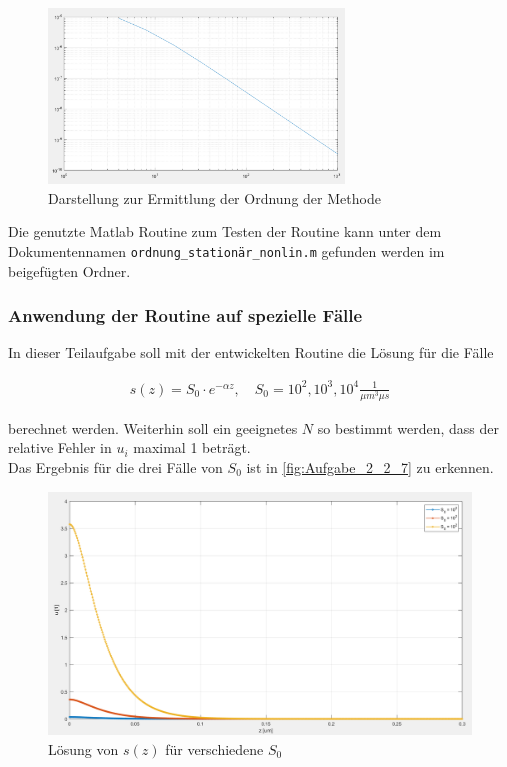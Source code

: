 \documentclass[
	pagesize,
	fontsize=12pt,
	paper=a4,
	oneside,
   reqno
]{scrartcl}
\begin{document}
\begin{figure}[H]
   \centering
   \includegraphics[width=0.7\textwidth]{Bilder/Aufgabe_2_2_6_b.png}
   \caption[Ordnung der Methode nichtlinear stationär]{Darstellung zur Ermittlung der Ordnung der Methode}
   \label{fig:Aufgabe_2_2_6_b}
\end{figure}

Die genutzte Matlab Routine zum Testen der Routine kann unter dem Dokumentennamen \texttt{ordnung\_stationär\_nonlin.m} gefunden werden im beigefügten Ordner.

\subsubsection{Anwendung der Routine auf spezielle Fälle}

In dieser Teilaufgabe soll mit der entwickelten Routine die Lösung für die Fälle

\begin{align*}
   s(z) = S_0 \cdot e^{-\alpha z}, \quad S_0 = 10^2, 10^3, 10^4 \frac{1}{\mu m^3 \mu s}
\end{align*}

berechnet werden. Weiterhin soll ein geeignetes $N$ so bestimmt werden, dass der relative Fehler in $u_i$ maximal 1\textperthousand{} beträgt. \\

Das Ergebnis für die drei Fälle von $S_0$ ist in \autoref{fig:Aufgabe_2_2_7} zu erkennen.

\begin{figure}[H]
   \centering
   \includegraphics[width=1\textwidth]{Bilder/Aufgabe_2_2_7.png}
   \caption[Lösung von $s(z)$]{Lösung von $s(z)$ für verschiedene $S_0$}
   \label{fig:Aufgabe_2_2_7}
\end{figure}
\end{document}
